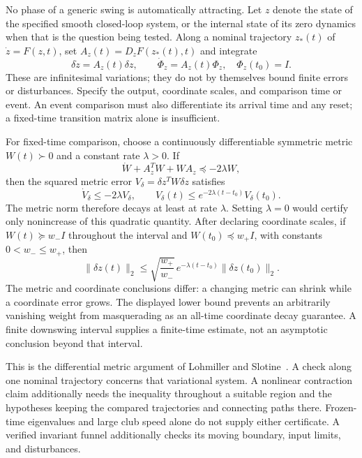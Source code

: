 No phase of a generic swing is automatically attracting. Let $z$ denote the
state of the specified smooth closed-loop system, or the internal state of
its zero dynamics when that is the question being tested. Along a nominal
trajectory $z_*(t)$ of $\dot z=F(z,t)$, set $A_z(t)=D_zF(z_*(t),t)$ and integrate
\begin{equation}
\delta\dot z=A_z(t)\delta z,\qquad
\dot\Phi_z=A_z(t)\Phi_z,\quad\Phi_z(t_0)=I.
\end{equation}
These are infinitesimal variations; they do not by themselves bound finite
errors or disturbances. Specify the output, coordinate scales, and comparison
time or event. An event comparison must also differentiate its arrival time
and any reset; a fixed-time transition matrix alone is insufficient.

For fixed-time comparison, choose a continuously differentiable symmetric
metric $W(t)\succ0$ and a constant rate $\lambda>0$. If
\begin{equation}
\dot W+A_z^TW+WA_z\preceq-2\lambda W,
\end{equation}
then the squared metric error $V_\delta=\delta z^TW\delta z$ satisfies
\begin{equation}
\dot V_\delta\leq-2\lambda V_\delta,\qquad
V_\delta(t)\leq e^{-2\lambda(t-t_0)}V_\delta(t_0).
\end{equation}
The metric norm therefore decays at least at rate $\lambda$. Setting
$\lambda=0$ would certify only nonincrease of this quadratic quantity.
After declaring coordinate scales, if $W(t)\succeq w_-I$ throughout the interval
and $W(t_0)\preceq w_+I$, with constants $0<w_-\leq w_+$, then
\begin{equation}
\|\delta z(t)\|_2\leq
\sqrt{\frac{w_+}{w_-}}\,e^{-\lambda(t-t_0)}\|\delta z(t_0)\|_2.
\end{equation}
The metric and coordinate conclusions differ: a changing metric can shrink
while a coordinate error grows. The displayed lower bound prevents an
arbitrarily vanishing weight from masquerading as an all-time coordinate
decay guarantee. A finite downswing interval supplies a finite-time estimate,
not an asymptotic conclusion beyond that interval.

This is the differential metric argument of Lohmiller and Slotine~\cite{LohmillerSlotine1998}.
A check along one nominal trajectory concerns that variational system.
A nonlinear contraction claim additionally needs the inequality throughout
a suitable region and the hypotheses keeping the compared trajectories and
connecting paths there. Frozen-time eigenvalues and large club speed alone
do not supply either certificate. A verified invariant funnel additionally
checks its moving boundary, input limits, and disturbances.

